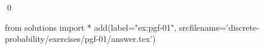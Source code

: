
\begin{ex} 
  \label{ex:pgf-01}
  
  \qed
\end{ex} 
\begin{python0}
from solutions import *
add(label="ex:pgf-01",
    srcfilename='discrete-probability/exercises/pgf-01/answer.tex') 
\end{python0}
